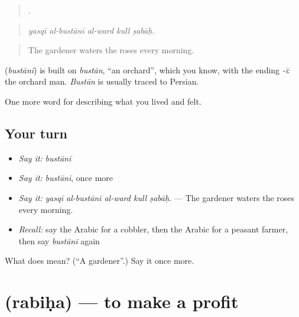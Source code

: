 \begin{quote}
    .
\end{quote}

\begin{quote}
\emph{yasqī al-bustānī al-ward kull ṣabāḥ.}
\end{quote}

\begin{quote}
The gardener waters the roses every morning.
\end{quote}

\begin{cousinweb}
\textbf{} (\emph{bustānī}) is built on \emph{bustān}, \textquotedblleft{}an orchard\textquotedblright{}, which you know, with the ending \emph{-ī}: the orchard man. \emph{Bustān} is usually traced to Persian.
\end{cousinweb}

\begin{grammarlens}[title={What you've built}]
One more word for describing what you lived and felt.
\end{grammarlens}

\subsection*{Your turn}
\begin{itemize}
\raggedright
  \item \emph{Say it:} \emph{bustānī}
  \item \emph{Say it:} \emph{bustānī}, once more
  \item \emph{Say it:} \emph{yasqī al-bustānī al-ward kull ṣabāḥ.} — The gardener waters the roses every morning.
  \item \emph{Recall:} say the Arabic for a cobbler, then the Arabic for a peasant farmer, then say \emph{bustānī} again
\end{itemize}

\begin{tcolorbox}[breakable,colback=teal!4,colframe=teal!35!black,title={Before you move on}]
What does  mean? (\textquotedblleft{}A gardener\textquotedblright{}.) Say it once more.
\end{tcolorbox}
\section[\texorpdfstring{\ar{ربح} (rabiḥa)}{ربح (rabiḥa)}]{ (rabiḥa) — to make a profit}

